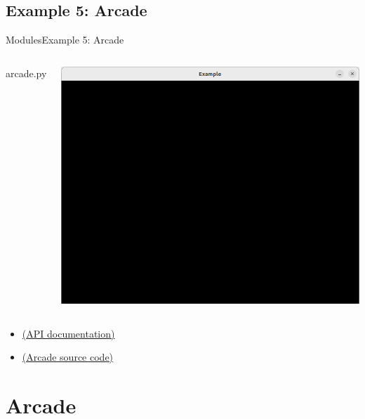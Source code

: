 \documentclass[10pt,compress]{beamer} %
\begin{document}
\subsection{Example 5: Arcade}
\begin{frame}{Modules}{Example 5: Arcade}
	\begin{columns}

		\vspace{-0.2cm}
		\begin{exampleblock}{arcade.py}
		\vspace{-0.2cm}
		
		\vspace{-0.2cm}
		\end{exampleblock}

		\vspace{-0.2cm}
		\centering \includegraphics[width=\linewidth]{figs/window.png}\\
		\vspace{-0.2cm}
	\end{columns}

	\begin{itemize}
		\item \href{https://api.arcade.academy/en/latest/arcade.html}{(API documentation)}
		\item \href{https://github.com/pythonarcade/arcade/tree/development}{(Arcade source code)}
	\end{itemize}
\end{frame}

\section{Arcade}
\end{document}
